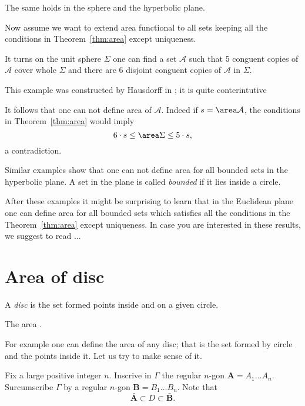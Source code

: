 

The same holds in the sphere and the hyperbolic plane.


Now assume we want to extend area functional to all sets keeping all the 
conditions in Theorem~\ref{thm:area} except uniqueness.

It turns on the unit sphere $\Sigma$ one can find a set
$\mathcal{A}$ such that 5 conguent copies of $\mathcal{A}$
cover whole $\Sigma$ and there are 6 disjoint conguent copies of $\mathcal{A}$ in $\Sigma$.

This example was constructed by Hausdorff in \cite{hausdorff};
it is quite conterintutive 

It follows that one can not define area of $\mathcal{A}$.
Indeed if $s=\area\mathcal{A}$,
the conditions in Theorem~\ref{thm:area} would imply 
\[6\cdot s\le \area \Sigma\le 5\cdot s,\]
a contradiction. 


Similar examples show that one can not define area for all bounded sets in the hyperbolic plane.
A set in the plane is called \emph{bounded} if it lies inside a circle.

After these examples it might be surprising to learn that
in the Euclidean plane one can define area for all bounded sets
which satisfies all the conditions in the Theorem~\ref{thm:area} except uniqueness.
In case you are interested in these results, we suggest to read ...


















\section*{Area of disc}

A \emph{disc} is the set 
formed points inside and on a given circle.

The area .

For example one can define the area of any disc;
that is the set formed by circle and the points inside it.
Let us try to make sense of it.

Fix a large positive integer $n$.
Inscrive in $\Gamma$ the regular $n$-gon $\bm{A}=A_1\dots A_n$.
Surcumscribe $\Gamma$ by a regular $n$-gon $\bm{B}=B_1\dots B_n$.
Note that 
\[\bar{\bm{A}}\subset D\subset\bar{\bm{B}}.\]

